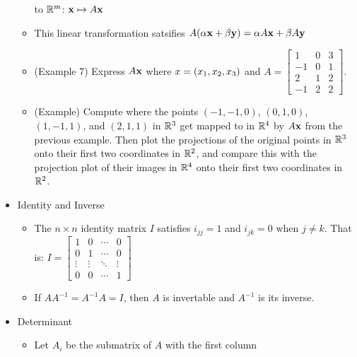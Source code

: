 \documentclass[11pt]{article}
\begin{document}
\begin{itemize}
\begin{itemize}
            to \(\mathbb R^m\): \(\mathbf{x} \mapsto A\mathbf{x}\)
      \item This linear transformation satsifies
            \(
              A(\alpha\mathbf{x} + \beta\mathbf{y})
                =
              \alpha A\mathbf{x} + \beta A\mathbf{y}
            \)
      \item (Example 7) Express \(A\mathbf{x}\) where \(x=\left(x_1,x_2,x_3\right)\) and
        \(
          A =
          \begin{bmatrix}
             1 &  0 &  3 \\
            -1 &  0 &  1 \\
             2 &  1 &  2 \\
            -1 &  2 &  2
          \end{bmatrix}
        \).
      \item (Example) Compute where the points
          \((-1,-1,0)\),
          \((0,1,0)\),
          \((1,-1,1)\), and
          \((2,1,1)\)
        in \(\mathbb R^3\) get
        mapped to in \(\mathbb R^4\) by \(A\mathbf{x}\) from the previous example.
        Then plot the projections of the original points in \(\mathbb R^3\) onto
        their first two coordinates in \(\mathbb R^2\),
        and compare this with the projection plot
        of their images in \(\mathbb R^4\) onto their first two coordinates in
        \(\mathbb R^2\).
    \end{itemize}
  \item Identity and Inverse
    \begin{itemize}
      \item
        The \(n\times n\) identity matrix \(I\) satisfies \(i_{jj}=1\)
        and \(i_{jk}=0\) when \(j\not=k\). That is:
        \(
          I =
          \begin{bmatrix}
            1      & 0      & \cdots & 0      \\
            0      & 1      & \cdots & 0      \\
            \vdots & \vdots & \ddots & \vdots \\
            0      & 0      & \cdots & 1
          \end{bmatrix}
        \)
      \item
        If \(AA^{-1}=A^{-1}A=I\), then \(A\) is invertable and
        \(A^{-1}\) is its inverse.
    \end{itemize}
  \item Determinant
    \begin{itemize}
      \item Let \(A_i\) be the submatrix of \(A\) with the first column

\end{itemize}
\end{itemize}
\end{document}
